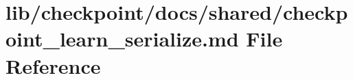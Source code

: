 \hypertarget{checkpoint__learn__serialize_8md}{}\section{lib/checkpoint/docs/shared/checkpoint\+\_\+learn\+\_\+serialize.md File Reference}
\label{checkpoint__learn__serialize_8md}
